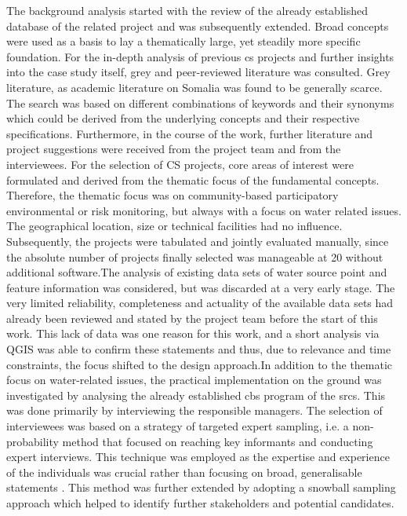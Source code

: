 The background analysis started with the review of the already established database of the related project and was subsequently extended. Broad concepts were used as a basis to lay a thematically large, yet steadily more specific foundation. For the in-depth analysis of previous \acrshort*{cs} projects and further insights into the case study itself, grey and peer-reviewed literature was consulted. Grey literature, as academic literature on Somalia was found to be generally scarce. The search was based on different combinations of keywords and their synonyms which could be derived from the underlying concepts and their respective specifications. Furthermore, in the course of the work, further literature and project suggestions were received from the project team and from the interviewees. For the selection of CS projects, core areas of interest were formulated and derived from the thematic focus of the fundamental concepts. Therefore, the thematic focus was on community-based participatory environmental or risk monitoring, but always with a focus on water related issues. The geographical location, size or technical facilities had no influence. Subsequently, the projects were tabulated and jointly evaluated manually, since the absolute number of projects finally selected was manageable at 20 without additional software.\linebreak[1]
The analysis of existing data sets of water source point and feature information was considered, but was discarded at a very early stage. The very limited reliability, completeness and actuality of the available data sets had already been reviewed and stated by the project team before the start of this work. This lack of data was one reason for this work, and a short analysis via QGIS was able to confirm these statements and thus, due to relevance and time constraints, the focus shifted to the design approach.\linebreak[0]
In addition to the thematic focus on water-related issues, the practical implementation on the ground was investigated by analysing the already established \acrshort*{cbs} program of the \acrshort*{srcs}. This was done primarily by interviewing the responsible managers.
The selection of interviewees was based on a strategy of targeted expert sampling, i.e. a non-probability method that focused on reaching key informants and conducting expert interviews. This technique was employed as the expertise and experience of the individuals was crucial rather than focusing on broad, generalisable statements \autocite{pelzResearchMethodsSocial}. This method was further extended by adopting a snowball sampling approach which helped to identify further stakeholders and potential candidates.\linebreak[1]
